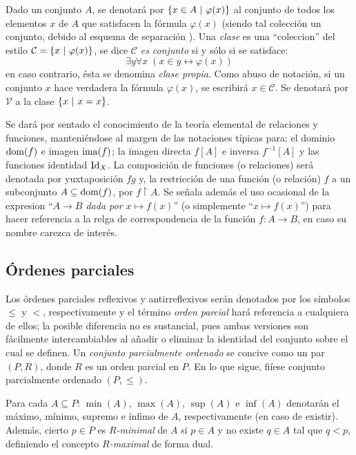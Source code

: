     Dado un conjunto $A$, se denotará por $\{x \in A \text{ $|$ } \varphi (x)\}$ al conjunto de todos los elementos $x$ de $A$ que satisfacen la fórmula $\varphi (x)$ (siendo tal colección un conjunto, debido al esquema de separación \cite[p.~xv]{kunenSet}). Una \textit{clase} es una ``coleccion'' del estilo $\mathcal{C} = \{x \text{ $|$ } \varphi (x)\}$, se dice $\mathcal{C}$ \textit{es conjunto} si y sólo si se satisface:
    $$\exists y \forall x \; ( x \in y \leftrightarrow \varphi(x)  ) $$
    en caso contrario, ésta se denomina \textit{clase propia}. Como abuso de notación, si un conjunto $x$ hace verdadera la fórmula $\varphi(x)$, se escribirá $x \in \mathcal{C}$. Se denotará por $\mathcal{V}$ a la clase $\{x \text{ $|$ } x=x\}$.
    
    \index[sym]{$\mapsto$}
    Se dará por sentado el conocimiento de la teoría elemental de relaciones y funciones, manteniéndose al margen de las notaciones típicas para: el dominio $\operatorname{dom}(f)$ e imagen $\operatorname{ima}(f)$; la imagen directa $f[A]$ e inversa $f^{-1}[A]$ y las funciones identidad $\operatorname{Id}_X$. La composición de funciones (o relaciones) será denotada por yuxtaposición $fg$ y, la restricción de una función (o relación) $f$ a un subconjunto $A \subseteq \operatorname{dom}(f)$, por $f \upharpoonright A$. Se señala además el uso ocasional de la expresion ``\textit{$A \to B$ dada por $x \mapsto f(x)$}'' (o simplemente ``$x \mapsto f(x)$'') para hacer referencia a la relga de correspondencia de la función $f:A \to B$, en caso su nombre carezca de interés.

    \subsection{Órdenes parciales}

    Los órdenes parciales reflexivos y antirreflexivos serán denotados por los símbolos $\leq$ y $<$, respectivamente y el término \textit{orden parcial} hará referencia a cualquiera de ellos; la posible diferencia no es sustancial, pues ambas versiones son fácilmente intercambiables al añadir o eliminar la identidad del conjunto sobre el cual se definen. Un \textit{conjunto parcialmente ordenado} se concive como un par $(P, R)$, donde $R$ es un orden parcial en $P$. En lo que sigue, fiíese conjunto parcialmente ordenado $(P, \leq)$.
    
    Para cada $A \subseteq P$: $\min(A)$, $\max(A)$, $\sup(A)$ e $\inf(A)$ denotarán el máximo, mínimo, supremo e ínfimo de $A$, respectivamente (en caso de existir). Además, cierto $p \in P$ es \textit{$R$-minimal} de $A$ si $p \in A$ y no existe $q \in A$ tal que $q < p$, definiendo el concepto \textit{$R$-maximal} de forma dual.

